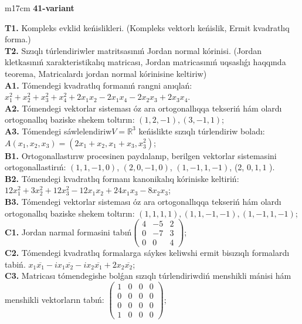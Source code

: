 \documentclass{article}
\begin{document}
\begin{tabular}{m{17cm}}
\textbf{41-variant}
\newline

\textbf{T1.} Kompleks evklid keńislikleri.  (Kompleks vektorlı keńislik, Ermit kvadratlıq forma.) \\
\textbf{T2.} Sızıqlı túrlendiriwler matritsasınıń Jordan normal kórinisi. (Jordan kletkasınıń xarakteristikalıq matricası, Jordan matricasınıń uqsaslıǵı haqqında teorema,  Matricalardı jordan normal kórinisine keltiriw) \\
\textbf{A1.} Tómendegi kvadratlıq formanıń rangni anıqlań: \(x_{1}^{2} + x_{2}^{2} + x_{3}^{2} + x_{4}^{2} + 2x_{1}x_{2} - 2x_{1}x_{4} - 2x_{2}x_{3} + 2x_{3}x_{4}\). \\
\textbf{A2.} Tómendegi vektorlar sisteması óz ara ortogonallıqqa tekseriń hám olardı ortogonallıq baziske shekem toltırın: \((1,2, - 1),(3, - 1,1)\); \\
\textbf{A3.} Tómendegi sáwlelendiriw\(V = \mathbb{R}^{3}\) keńislikte sızıqlı túrlendiriw boladı: \(A\left( x_{1},x_{2},x_{3} \right) = \left( 2x_{1} + x_{2},x_{1} + x_{3},x_{3}^{2} \right)\); \\
\textbf{B1.} Ortogonallastırıw procesinen paydalanıp, berilgen vektorlar sistemasini ortogonallastirıń: \((1,1, - 1,0)\), \((2,0, - 1,0)\), \((1, - 1,1, - 1)\), (2, \(0,1,1\) ). \\
\textbf{B2.} Tómendegi kvadratlıq formanı kanonikalıq kóriniske keltiriń: \(12x_{1}^{2} + 3x_{2}^{2} + 12x_{3}^{2} - 12x_{1}x_{2} + 24x_{1}x_{3} - 8x_{2}x_{3}\); \\
\textbf{B3.} Tómendegi vektorlar sisteması óz ara ortogonallıqqa tekseriń hám olardı ortogonallıq baziske shekem toltırın: \((1,1,1,1),(1,1, - 1, - 1),(1, - 1,1, - 1)\); \\
\textbf{C1.} Jordan narmal formasini tabıń\(\begin{pmatrix} 4 & - 5 & 2 \\ 0 & - 7 & 3 \\ 0 & 0 & 4 \end{pmatrix}\); \\
\textbf{C2.} Tómendegi kvadratlıq formalarga sáykes keliwshi ermit bisızıqlı formalardı tabiń. \(x_{1}\overline{x_{1}} - ix_{1}\overline{x_{2}} - ix_{2}\overline{x_{1}} + 2x_{2}\overline{x_{2}}\); \\
\textbf{C3.} Matricası tómendegishe bolǵan sızıqlı túrlendiriwdiń menshikli mánisi hám menshikli vektorların tabıń: \(\begin{pmatrix} 1 & 0 & 0 & 0 \\ 0 & 0 & 0 & 0 \\ 0 & 0 & 0 & 0 \\ 1 & 0 & 0 & 0 \end{pmatrix}\); \\

\end{tabular}
\vspace{1cm}
\end{document}

